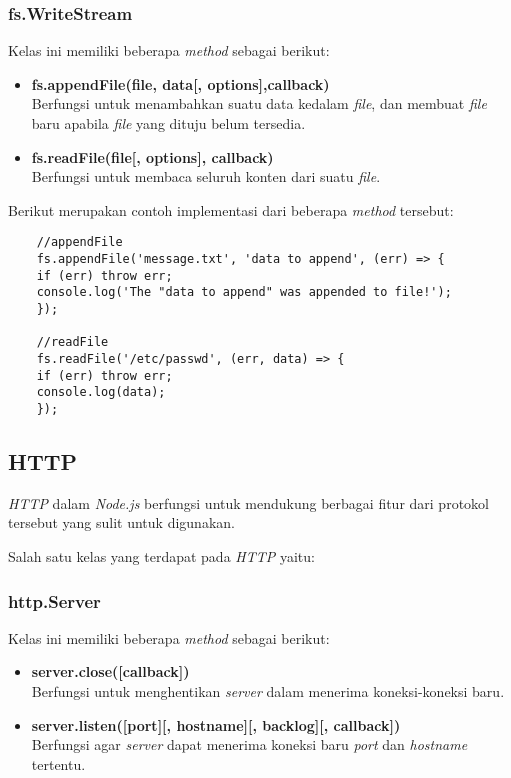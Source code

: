 \subsubsection{fs.WriteStream}
Kelas ini memiliki beberapa \textit{method} sebagai berikut: 

\begin{itemize}
	\item \textbf{fs.appendFile(file, data[, options],callback)} \\ Berfungsi untuk menambahkan suatu data kedalam \textit{file}, dan membuat \textit{file} baru apabila \textit{file} yang dituju belum tersedia.
	\item \textbf{fs.readFile(file[, options], callback)} \\ Berfungsi untuk membaca seluruh konten dari suatu \textit{file}.
\end{itemize}

Berikut merupakan contoh implementasi dari beberapa \textit{method} tersebut:

\begin{lstlisting}
	//appendFile
	fs.appendFile('message.txt', 'data to append', (err) => {
	if (err) throw err;
	console.log('The "data to append" was appended to file!');
	});
	
	//readFile
	fs.readFile('/etc/passwd', (err, data) => {
	if (err) throw err;
	console.log(data);
	});
\end{lstlisting}

\subsection{HTTP}
\textit{HTTP} dalam \textit{Node.js} berfungsi untuk mendukung berbagai fitur dari protokol tersebut yang sulit untuk digunakan. 

Salah satu kelas yang terdapat pada \textit{HTTP} yaitu: 

\subsubsection{http.Server}
Kelas ini memiliki beberapa \textit{method} sebagai berikut: 

\begin{itemize}
	\item \textbf{server.close([callback])} \\ Berfungsi untuk menghentikan \textit{server} dalam menerima koneksi-koneksi baru.
	\item \textbf{server.listen([port][, hostname][, backlog][, callback])} \\ Berfungsi agar \textit{server} dapat menerima koneksi baru \textit{port} dan \textit{hostname} tertentu.
\end{itemize}

